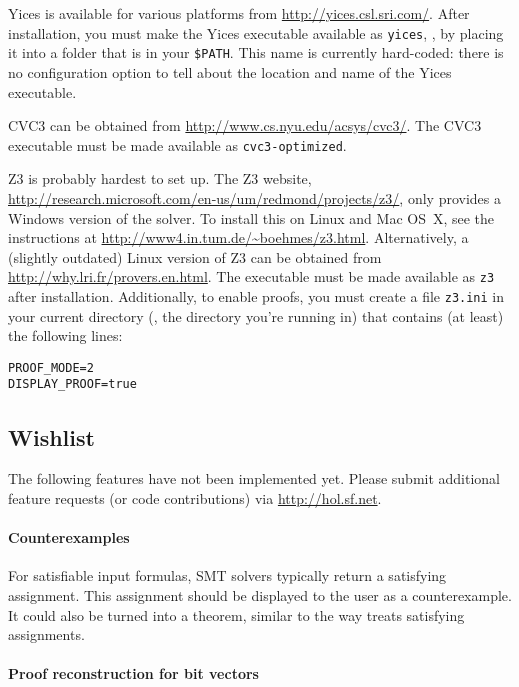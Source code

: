 Yices is available for various platforms from
\url{http://yices.csl.sri.com/}.  After installation, you must make
the Yices executable available as {\tt yices}, \eg, by placing it into
a folder that is in your {\tt \$PATH}.  This name is currently
hard-coded: there is no configuration option to tell \HOL{} about the
location and name of the Yices executable.

CVC3 can be obtained from \url{http://www.cs.nyu.edu/acsys/cvc3/}.
The CVC3 executable must be made available as {\tt cvc3-optimized}.

Z3 is probably hardest to set up.  The Z3 website,
\url{http://research.microsoft.com/en-us/um/redmond/projects/z3/},
only provides a Windows version of the solver.  To install this on
Linux and Mac OS~X, see the instructions at
\url{http://www4.in.tum.de/~boehmes/z3.html}.  Alternatively, a
(slightly outdated) Linux version of Z3 can be obtained from
\url{http://why.lri.fr/provers.en.html}.  The executable must be made
available as {\tt z3} after installation.  Additionally, to enable
proofs, you must create a file {\tt z3.ini} in your current directory
(\ie, the directory you're running \HOL{} in) that contains (at least)
the following lines:
\begin{verbatim}
PROOF_MODE=2
DISPLAY_PROOF=true
\end{verbatim}

\subsection{Wishlist}

The following features have not been implemented yet.  Please submit
additional feature requests (or code contributions) via
\url{http://hol.sf.net}.

\paragraph{Counterexamples}

For satisfiable input formulas, SMT solvers typically return a
satisfying assignment.  This assignment should be displayed to the
\HOL{} user as a counterexample.  It could also be turned into a
theorem, similar to the way  treats satisfying
assignments.

\paragraph{Proof reconstruction for bit vectors}

